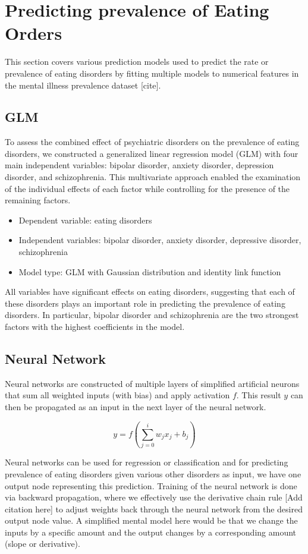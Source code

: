 \section{Predicting prevalence of Eating Orders}

This section covers various prediction models used to predict the rate or prevalence of eating disorders by fitting multiple models to numerical features in the mental illness prevalence dataset [cite]. 

\subsection{GLM}
To assess the combined effect of psychiatric disorders on the prevalence of eating disorders, we constructed a generalized linear regression model (GLM) with four main independent variables: bipolar disorder, anxiety disorder, depression disorder, and schizophrenia. This multivariate approach enabled the examination of the individual effects of each factor while controlling for the presence of the remaining factors.
\begin{itemize}
    \item Dependent variable: eating disorders
    \item Independent variables: bipolar disorder, anxiety disorder, depressive disorder, schizophrenia
    \item Model type: GLM with Gaussian distribution and identity link function
\end{itemize}
All variables have significant effects on eating disorders, suggesting that each of these disorders plays an important role in predicting the prevalence of eating disorders. In particular, bipolar disorder and schizophrenia are the two strongest factors with the highest coefficients in the model.

\subsection{Neural Network}

Neural networks are constructed of multiple layers of simplified artificial neurons that sum all weighted inputs (with bias) and apply activation \( f \). This result \( y \) can then be propagated as an input in the next layer of the neural network. 

\[
y = f\left(\sum_{j=0}^{i} w_j x_j + b_j \right)
\]

Neural networks can be used for regression or classification and for predicting prevalence of eating disorders given various other disorders as input, we have one output node representing this prediction. Training of the neural network is done via backward propagation, where we effectively use the derivative chain rule [Add citation here] to adjust weights back through the neural network from the desired output node value. A simplified mental model here would be that we change the inputs by a specific amount and the output changes by a corresponding amount (slope or derivative).  

